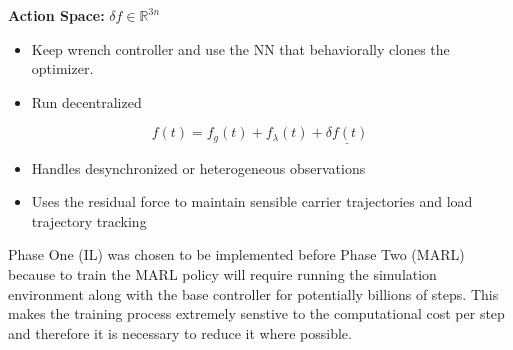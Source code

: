 \noindent\textbf{Action Space:} $\delta f \in \mathbb{R}^{3n}$

\begin{itemize}
  \item Keep wrench controller and use the NN that behaviorally clones the optimizer.
  \item Run decentralized
\end{itemize}

\begin{equation}
  f(t) = f_g(t) + f_\lambda(t) + \underline{\delta f(t)}
  \label{eq:residual-action-force}
\end{equation}

\begin{itemize}
  \item Handles desynchronized or heterogeneous observations
  \item Uses the residual force to maintain sensible carrier trajectories and load trajectory tracking
\end{itemize}

Phase One (IL) was chosen to be implemented before Phase Two (MARL) because
to train the MARL policy will require running the simulation environment along
with the base controller for potentially billions of steps. This makes the
training process extremely senstive to the computational cost per step and 
therefore it is necessary to reduce it where possible.
